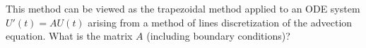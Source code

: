 This method can be viewed as the trapezoidal method applied to an ODE system $U'(t) = AU(t)$ arising from a method of
lines discretization of the advection equation. What is the matrix $A$ (including boundary conditions)?

\begin{solution}\ \\\\
    \hfill\vfill
    \ \\
\end{solution}